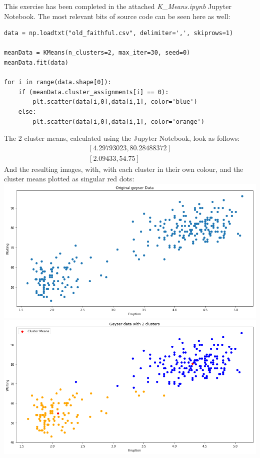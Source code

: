 This exercise has been completed in the attached \textit{K\_Means.ipynb} Jupyter Notebook. The most relevant bits of source code can be seen here as well:
\begin{verbatim}
data = np.loadtxt("old_faithful.csv", delimiter=',', skiprows=1)

meanData = KMeans(n_clusters=2, max_iter=30, seed=0)
meanData.fit(data)

for i in range(data.shape[0]):
    if (meanData.cluster_assignments[i] == 0):
        plt.scatter(data[i,0],data[i,1], color='blue')
    else:
        plt.scatter(data[i,0],data[i,1], color='orange')
\end{verbatim}
The 2 cluster means, calculated using the Jupyter Notebook, look as follows:
$$
\begin{matrix}
[4.29793023,80.28488372] \\
[2.09433,54.75]
\end{matrix}
$$
And the resulting images, with, with each cluster in their own colour, and the cluster means plotted as singular red dots:\\
\includegraphics[width=\linewidth]{3a1.png}\\
\includegraphics[width=\linewidth]{3a2.png}\\